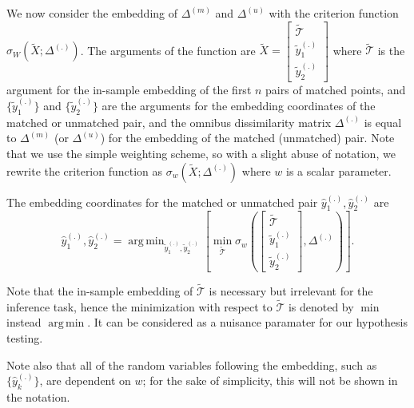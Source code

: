 \documentclass[12pt]{article} %
\DeclareMathOperator*{\argmin}{arg\,min}
\newenvironment{remark}[1][Remark]{\begin{trivlist}
\item[\hskip \labelsep {\bfseries #1}]}{\end{trivlist}}
\begin{document}


 We now consider the embedding of $\Delta^{(m)}$ and $\Delta^{(u)}$ with the criterion function  $\sigma_W(\widetilde{X}; \Delta^{(.)})$. The arguments of the function are  $\widetilde{X}= \left[
\begin{array}{c}
{\widetilde{\mathcal{T}}} \\
\widetilde{y}_{1}^{(.)} \\
\widetilde{y}_{2}^{(.)}
\end {array}
\right]$ where ${\widetilde{\mathcal{T}}}$ is the argument for the in-sample embedding of the first $n$ pairs of matched points, and
 $\{\widetilde{y}_{1}^{(.)} \}$ and $\{\widetilde{y}_{2}^{(.)} \}$ are the arguments for the embedding coordinates of the matched  or unmatched pair,
and the omnibus dissimilarity matrix $\Delta^{(.)}$ is equal to  $\Delta^{(m)}$  (or $\Delta^{(u)}$) for the embedding of the  matched (unmatched) pair. Note that we use the simple weighting scheme, so with a slight abuse of notation, we rewrite the criterion function as  $\sigma_w(\widetilde{X}; \Delta^{(.)})$ where $w$ is a scalar parameter.

The embedding coordinates for the matched or unmatched pair  ${\hat{y}_{1}^{(.)},\hat{y}_{2}^{(.)}}$ are
 \[
{\hat{y}_{1}^{(.)},\hat{y}_{2}^{(.)}}
=\argmin_{\widetilde{y}_{1}^{(.)}, \widetilde{y}_{2}^{(.)}}\left[\min_{\widetilde{\mathcal{T}}}
{\sigma_w\left(
\left[
\begin{array}{c}
{\widetilde{\mathcal{T}}} \\
\widetilde{y}_{1}^{(.)} \\
\widetilde{y}_{2}^{(.)}
\end {array}
\right]
,
\Delta^{(.)}
\right)
}
\right].
\]

\begin{remark}
 Note that the in-sample embedding of $\widetilde{\mathcal{T}}$ is necessary but irrelevant for the inference task, hence the minimization with respect to $\widetilde{\mathcal{T}}$ is denoted by  $\min$ instead $\argmin$. It can be considered as a nuisance paramater for our hypothesis testing.
\end{remark}
\begin{remark}
 Note also that  all of the random variables following the embedding, such as $\{\hat{y}_{k}^{(.)}\}\!$,  are dependent on $w$; for the sake of simplicity, this will not be shown in the notation. 
\end{remark}
\end{document}
